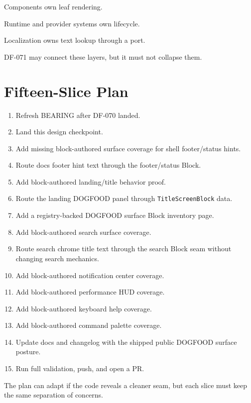 Components own leaf rendering.

Runtime and provider systems own lifecycle.

Localization owns text lookup through a port.

DF-071 may connect these layers, but it must not collapse them.

\section{Fifteen-Slice Plan}\label{record-111-fifteen-slice-plan}

\begin{enumerate}
\def\labelenumi{\arabic{enumi}.}
\tightlist
\item
  Refresh BEARING after DF-070 landed.
\item
  Land this design checkpoint.
\item
  Add missing block-authored surface coverage for shell footer/status hints.
\item
  Route docs footer hint text through the footer/status Block.
\item
  Add block-authored landing/title behavior proof.
\item
  Route the landing DOGFOOD panel through \texttt{T\allowbreak{}i\allowbreak{}t\allowbreak{}l\allowbreak{}e\allowbreak{}S\allowbreak{}c\allowbreak{}r\allowbreak{}e\allowbreak{}e\allowbreak{}n\allowbreak{}B\allowbreak{}l\allowbreak{}o\allowbreak{}c\allowbreak{}k} data.
\item
  Add a registry-backed DOGFOOD surface Block inventory page.
\item
  Add block-authored search surface coverage.
\item
  Route search chrome title text through the search Block seam without changing search mechanics.
\item
  Add block-authored notification center coverage.
\item
  Add block-authored performance HUD coverage.
\item
  Add block-authored keyboard help coverage.
\item
  Add block-authored command palette coverage.
\item
  Update docs and changelog with the shipped public DOGFOOD surface posture.
\item
  Run full validation, push, and open a PR.
\end{enumerate}

The plan can adapt if the code reveals a cleaner seam, but each slice must keep the same separation of concerns.

